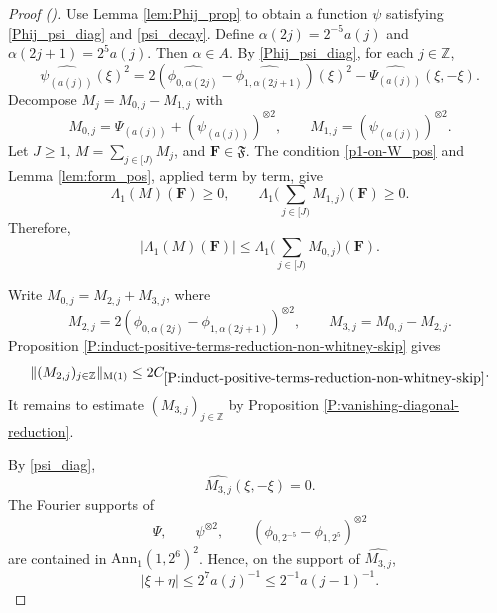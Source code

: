 \documentclass[12pt,reqno]{amsart}
\newcommand{\auto}{{({\tiny\faCar})}}
\theoremstyle{plain}
\numberwithin{equation}{section}
\theoremstyle{remark}
\newcommand{\Z}{{\mathbb Z}}
\newcommand{\F}{\mathbf{F}}
\begin{document}
\begin{proof}[Proof \auto]
Use Lemma \ref{lem:Phij_prop} to obtain a function $\psi$ satisfying \eqref{Phij_psi_diag} and \eqref{psi_decay}. Define $\alpha(2j)=2^{-5}a(j)$ and $\alpha(2j+1)=2^5a(j)$. Then $\alpha\in A$. By \eqref{Phij_psi_diag}, for each $j\in\Z$,
\begin{equation}\label{psi_diag}
\widehat{\psi_{(a(j))}}(\xi)^2
=2(\widehat{\phi_{0,\alpha(2j)}}-\widehat{\phi_{1,\alpha(2j+1)}})(\xi)^2
-\widehat{\Psi_{(a(j))}}(\xi,-\xi).
\end{equation}
Decompose $M_j=M_{0,j}-M_{1,j}$ with
\[
M_{0,j}=\Psi_{(a(j))}+(\psi_{(a(j))})^{\otimes2},
\qquad
M_{1,j}=(\psi_{(a(j))})^{\otimes2}.
\]
Let $J\ge1$, $M=\sum_{j\in[J)}M_j$, and $\F\in\mathfrak F$. The condition \eqref{p1-on-W_pos} and Lemma \ref{lem:form_pos}, applied term by term, give
\[
\Lambda_1(M)(\F)\ge0,
\qquad
\Lambda_1\Big(\sum_{j\in[J)}M_{1,j}\Big)(\F)\ge0.
\]
Therefore,
\begin{equation}\label{K0_split}
|\Lambda_1(M)(\F)|
\le\Lambda_1\Big(\sum_{j\in[J)}M_{0,j}\Big)(\F).
\end{equation}

Write $M_{0,j}=M_{2,j}+M_{3,j}$, where
\[
M_{2,j}=2(\phi_{0,\alpha(2j)}-\phi_{1,\alpha(2j+1)})^{\otimes2},
\qquad
M_{3,j}=M_{0,j}-M_{2,j}.
\]
Proposition \ref{P:induct-positive-terms-reduction-non-whitney-skip} gives
\[
\|(M_{2,j})_{j\in\Z}\|_{\rm M(1)}
\le2C_{\ref{P:induct-positive-terms-reduction-non-whitney-skip}}.
\]
It remains to estimate $(M_{3,j})_{j\in\Z}$ by Proposition \ref{P:vanishing-diagonal-reduction}.

By \eqref{psi_diag},
\[
\widehat{M_{3,j}}(\xi,-\xi)=0.
\]
The Fourier supports of
\[
\Psi,
\qquad
\psi^{\otimes2},
\qquad
(\phi_{0,2^{-5}}-\phi_{1,2^5})^{\otimes2}
\]
are contained in $\mathrm{Ann}_1(1,2^6)^2$. Hence, on the support of $\widehat{M_{3,j}}$,
\begin{equation}\label{xi_plus_eta}
|\xi+\eta|\le2^7a(j)^{-1}\le2^{-1}a(j-1)^{-1}.
\end{equation}


\end{proof}
\end{document}
